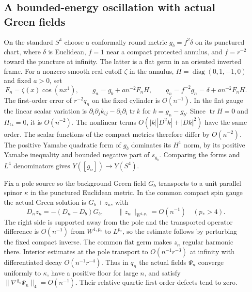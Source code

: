 \documentclass[11pt]{article}
\theoremstyle{remark}
\newcommand{\Tr}{\operatorname{tr}}
\begin{document}
\subsection{A bounded-energy oscillation with actual Green fields}
On the standard \(S^4\) choose a conformally round metric \(g_b=f^2\delta\) on its punctured chart, where \(\delta\) is Euclidean, \(f=1\) near a compact protected annulus, and \(f=r^{-2}\) toward the puncture at infinity. The latter is a flat germ in an oriented inverted frame. For a nonzero smooth real cutoff \(\zeta\) in the annulus, \(H=\operatorname{diag}(0,1,-1,0)\) and fixed \(a>0\), set
\[
 F_n=\zeta(x)\cos(nx^1),\qquad
 g_n=g_b+a n^{-2}F_n H,\qquad
 q_n=f^{-2}g_n=\delta+a n^{-2}F_n H.
\]
The first-order error of \(r^{-2}q_n\) on the fixed cylinder is \(O(n^{-1})\). In the flat gauge the linear scalar variation is \(\partial_i\partial_j k_{ij}-\partial_i\partial_i\Tr k\) for \(k=g_n-g_b\). Since \(\Tr H=0\) and \(H_{1i}=0\), it is \(O(n^{-2})\). The nonlinear terms \(O(|k||D^2k|+|Dk|^2)\) have the same order. The scalar functions of the compact metrics therefore differ by \(O(n^{-2})\). The positive Yamabe quadratic form of \(g_b\) dominates its \(H^1\) norm, by its positive Yamabe inequality and bounded negative part of \(s_{g_b}\). Comparing the forms and \(L^4\) denominators gives \(Y([g_n])\to Y(S^4)\).

Fix a pole source so the background Green field \(G_b\) transports to a unit parallel spinor \(\kappa\) in the punctured Euclidean metric. In the common compact spin gauge the actual Green solution is \(G_b+z_n\), with
\[
 D_nz_n=-(D_n-D_b)G_b,\qquad \|z_n\|_{W^{1,p_*}}=O(n^{-1})\quad(p_*>4).
\]
The right side is supported away from the pole and the transported operator difference is \(O(n^{-1})\) from \(W^{1,p_*}\) to \(L^{p_*}\), so the estimate follows by perturbing the fixed compact inverse. The common flat germ makes \(z_n\) regular harmonic there. Interior estimates at the pole transport to \(O(n^{-1}r^{-3})\) at infinity with differentiated decay \(O(n^{-1}r^{-4})\). Thus in \(q_n\) the actual fields \(\Psi_n\) converge uniformly to \(\kappa\), have a positive floor for large \(n\), and satisfy \(\|\nabla^{q_n}\Psi_n\|_4=O(n^{-1})\). Their relative quartic first-order defects tend to zero.
\end{document}

